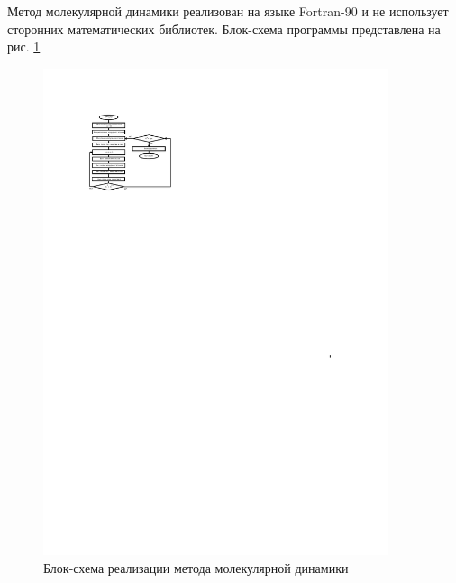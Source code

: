 Метод молекулярной динамики реализован на языке Fortran-90 и не использует сторонних математических
библиотек. Блок-схема программы представлена на рис. \ref{block_MD}

\begin{figure}[ht!]
 \begin{center}
 \includegraphics[width=0.9\textwidth]{FIGs/MD1crop.pdf}
 \end{center}
 \caption {Блок-схема реализации метода молекулярной динамики}
 \label{block_MD} 
\end{figure}

